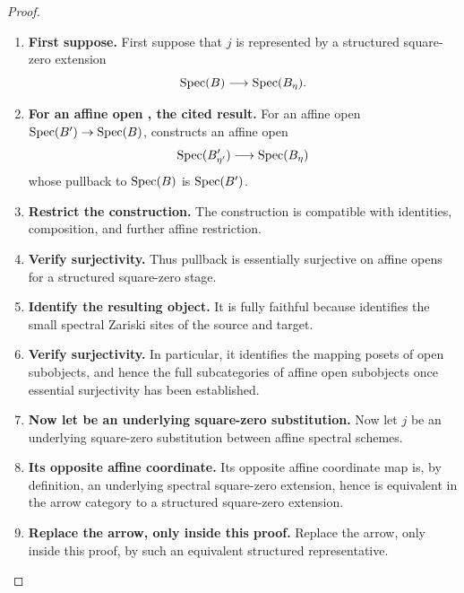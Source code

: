 \begin{proof}
\leavevmode
\begin{enumerate}[label=\textup{(\arabic*)}]
    \item \textbf{First suppose.}
    First suppose that \(j\) is represented by a structured square-zero extension
    \[
        \operatorname{Spec}(B)\longrightarrow\operatorname{Spec}(B_\eta).
    \]

    \item \textbf{For an affine open , the cited result.}
    For an affine open \(\operatorname{Spec}(B')\to\operatorname{Spec}(B)\),  constructs an
    affine open
    \[
        \operatorname{Spec}(B'_{\eta'})\longrightarrow\operatorname{Spec}(B_\eta)
    \]
    whose pullback to \(\operatorname{Spec}(B)\) is \(\operatorname{Spec}(B')\).

    \item \textbf{Restrict the construction.}
    The construction is compatible with identities, composition, and further affine restriction.

    \item \textbf{Verify surjectivity.}
    Thus pullback is essentially surjective on affine opens for a structured square-zero stage.

    \item \textbf{Identify the resulting object.}
    It is fully faithful because  identifies the
    small spectral Zariski sites of the source and target.

    \item \textbf{Verify surjectivity.}
    In particular, it identifies the mapping posets of open subobjects, and hence the full
    subcategories of affine open subobjects once essential surjectivity has been established.

    \item \textbf{Now let be an underlying square-zero substitution.}
    Now let \(j\) be an underlying square-zero substitution between affine spectral
    schemes.

    \item \textbf{Its opposite affine coordinate.}
    Its opposite affine coordinate map is, by definition, an underlying spectral square-zero
    extension, hence is equivalent in the arrow category to a structured square-zero extension.

    \item \textbf{Replace the arrow, only inside this proof.}
    Replace the arrow, only inside this proof, by such an equivalent structured representative.


\end{enumerate}
\end{proof}
